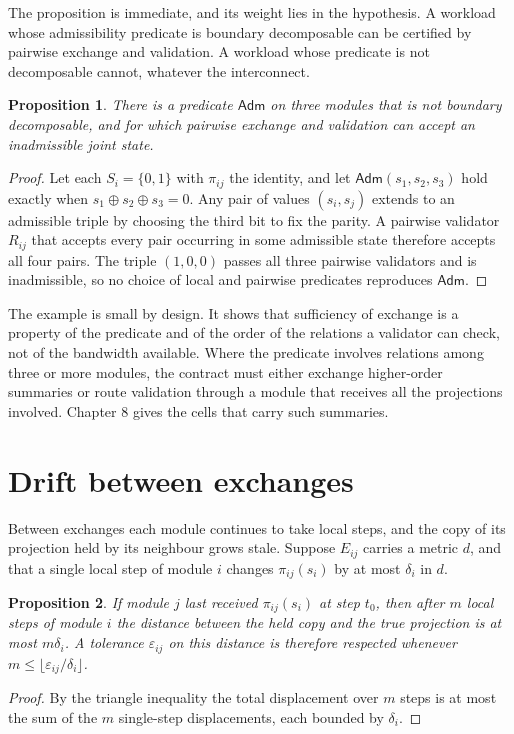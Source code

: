 \documentclass[11pt,openany]{book}
\newtheorem{proposition}{Proposition}[chapter]
\theoremstyle{remark}
\newcommand{\Adm}{\mathsf{Adm}}
\begin{document}
The proposition is immediate, and its weight lies in the hypothesis. A workload whose admissibility predicate is boundary decomposable can be certified by pairwise exchange and validation. A workload whose predicate is not decomposable cannot, whatever the interconnect.

\begin{proposition}\label{prop:nondecomp}
There is a predicate $\Adm$ on three modules that is not boundary decomposable, and for which pairwise exchange and validation can accept an inadmissible joint state.
\end{proposition}
\begin{proof}
Let each $S_i=\{0,1\}$ with $\pi_{ij}$ the identity, and let $\Adm(s_1,s_2,s_3)$ hold exactly when $s_1\oplus s_2\oplus s_3=0$. Any pair of values $(s_i,s_j)$ extends to an admissible triple by choosing the third bit to fix the parity. A pairwise validator $R_{ij}$ that accepts every pair occurring in some admissible state therefore accepts all four pairs. The triple $(1,0,0)$ passes all three pairwise validators and is inadmissible, so no choice of local and pairwise predicates reproduces $\Adm$.
\end{proof}

The example is small by design. It shows that sufficiency of exchange is a property of the predicate and of the order of the relations a validator can check, not of the bandwidth available. Where the predicate involves relations among three or more modules, the contract must either exchange higher-order summaries or route validation through a module that receives all the projections involved. Chapter 8 gives the cells that carry such summaries.

\section{Drift between exchanges}

Between exchanges each module continues to take local steps, and the copy of its projection held by its neighbour grows stale. Suppose $E_{ij}$ carries a metric $d$, and that a single local step of module $i$ changes $\pi_{ij}(s_i)$ by at most $\delta_i$ in $d$.

\begin{proposition}\label{prop:drift}
If module $j$ last received $\pi_{ij}(s_i)$ at step $t_0$, then after $m$ local steps of module $i$ the distance between the held copy and the true projection is at most $m\delta_i$. A tolerance $\varepsilon_{ij}$ on this distance is therefore respected whenever $m\le\lfloor\varepsilon_{ij}/\delta_i\rfloor$.
\end{proposition}
\begin{proof}
By the triangle inequality the total displacement over $m$ steps is at most the sum of the $m$ single-step displacements, each bounded by $\delta_i$.
\end{proof}
\end{document}

